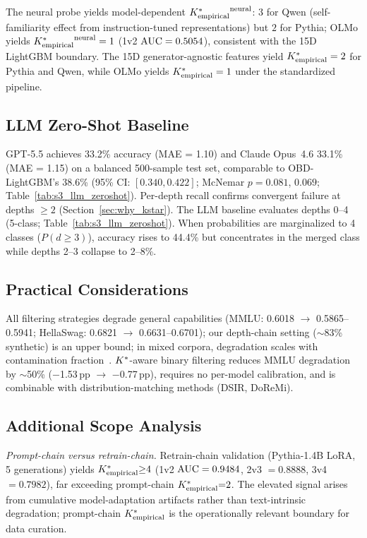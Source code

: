 The neural probe yields model-dependent ${K^*_{\text{empirical}}}^{\text{neural}}$: $3$ for Qwen (self-familiarity effect from instruction-tuned representations) but $2$ for Pythia; OLMo yields ${K^*_{\text{empirical}}}^{\text{neural}} = 1$ (1v2 $\text{AUC} = 0.5054$), consistent with the 15D LightGBM boundary.
The 15D generator-agnostic features yield ${K^*_{\text{empirical}}} = 2$ for Pythia and Qwen, while OLMo yields ${K^*_{\text{empirical}}} = 1$ under the standardized pipeline.

\subsection{LLM Zero-Shot Baseline}
\label{sec:extended_llm}

GPT-5.5 achieves 33.2\% accuracy (MAE = 1.10) and Claude Opus~4.6 33.1\% (MAE = 1.15) on a balanced 500-sample test set, comparable to OBD-LightGBM's 38.6\% (95\% CI: $[0.340, 0.422]$; McNemar $p = 0.081$, $0.069$; Table~\ref{tab:s3_llm_zeroshot}).
Per-depth recall confirms convergent failure at depths $\geq 2$ (Section~\ref{sec:why_kstar}).
The LLM baseline evaluates depths 0--4 (5-class; Table~\ref{tab:s3_llm_zeroshot}). When probabilities are marginalized to 4 classes ($P(d{\geq}3)$), accuracy rises to 44.4\% but concentrates in the merged class while depths 2--3 collapse to 2--8\%.

\subsection{Practical Considerations}

All filtering strategies degrade general capabilities (MMLU: 0.6018 $\to$ 0.5865--0.5941; HellaSwag: 0.6821 $\to$ 0.6631--0.6701); our depth-chain setting (${\sim}$83\% synthetic) is an upper bound; in mixed corpora, degradation scales with contamination fraction~\cite{shumailov2024collapse, dohmatob2024model}.
${K^*}$-aware binary filtering reduces MMLU degradation by ${\sim}$50\% ($-$1.53\,pp $\to$ $-$0.77\,pp), requires no per-model calibration, and is combinable with distribution-matching methods (DSIR, DoReMi).

\subsection{Additional Scope Analysis}
\label{sec:extended_limitations}

\emph{Prompt-chain versus retrain-chain.}
Retrain-chain validation (Pythia-1.4B LoRA, 5 generations) yields ${K^*_{\text{empirical}}}{\geq}4$ (1v2 $\text{AUC} = 0.9484$, 2v3 $= 0.8888$, 3v4 $= 0.7982$), far exceeding prompt-chain ${K^*_{\text{empirical}}}{=}2$.
The elevated signal arises from cumulative model-adaptation artifacts rather than text-intrinsic degradation; prompt-chain ${K^*_{\text{empirical}}}$ is the operationally relevant boundary for data curation.

